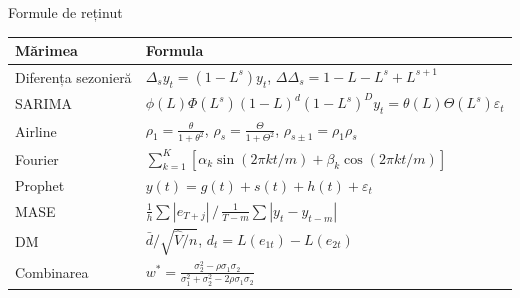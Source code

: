 \begin{frame}{Formule de reținut}
\itemsize{\small}
{\renewcommand{\arraystretch}{1.35}\begin{center}
\scriptsize
\begin{tabular}{ll}
\toprule
\textbf{Mărimea} & \textbf{Formula} \\
\midrule
Diferența sezonieră & $\Delta_sy_t = (1 - L^s)y_t$, \quad $\Delta\Delta_s = 1 - L - L^s + L^{s+1}$ \\
SARIMA & $\phi(L)\Phi(L^s)(1 - L)^d(1 - L^s)^Dy_t = \theta(L)\Theta(L^s)\varepsilon_t$ \\
Airline & $\rho_1 = \frac{\theta}{1 + \theta^2}$, \quad $\rho_s = \frac{\Theta}{1 + \Theta^2}$, \quad $\rho_{s \pm 1} = \rho_1\rho_s$ \\
Fourier & $\sum_{k=1}^{K}[\alpha_k\sin(2\pi kt/m) + \beta_k\cos(2\pi kt/m)]$ \\
Prophet & $y(t) = g(t) + s(t) + h(t) + \varepsilon_t$ \\
MASE & $\frac1h\sum|e_{T+j}| \,/\, \frac{1}{T - m}\sum|y_t - y_{t-m}|$ \\
DM & $\bar d/\sqrt{\hat V/n}$, \quad $d_t = L(e_{1t}) - L(e_{2t})$ \\
Combinarea & $w^* = \frac{\sigma_2^2 - \rho\sigma_1\sigma_2}{\sigma_1^2 + \sigma_2^2 - 2\rho\sigma_1\sigma_2}$ \\
\bottomrule
\end{tabular}
\end{center}
}
\end{frame}


